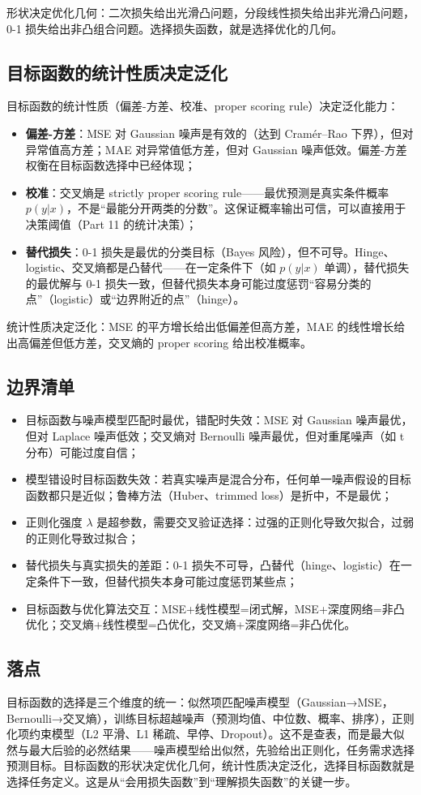 形状决定优化几何：二次损失给出光滑凸问题，分段线性损失给出非光滑凸问题，0-1 损失给出非凸组合问题。选择损失函数，就是选择优化的几何。

\subsection{目标函数的统计性质决定泛化}

目标函数的统计性质（偏差-方差、校准、proper scoring rule）决定泛化能力：

\begin{itemize}
\tightlist
\item
  \textbf{偏差-方差}：MSE 对 Gaussian 噪声是有效的（达到 Cramér--Rao 下界），但对异常值高方差；MAE 对异常值低方差，但对 Gaussian 噪声低效。偏差-方差权衡在目标函数选择中已经体现；
\item
  \textbf{校准}：交叉熵是 strictly proper scoring rule——最优预测是真实条件概率 $p(y|x)$，不是``最能分开两类的分数''。这保证概率输出可信，可以直接用于决策阈值（Part 11 的统计决策）；
\item
  \textbf{替代损失}：0-1 损失是最优的分类目标（Bayes 风险），但不可导。Hinge、logistic、交叉熵都是凸替代——在一定条件下（如 $p(y|x)$ 单调），替代损失的最优解与 0-1 损失一致，但替代损失本身可能过度惩罚``容易分类的点''（logistic）或``边界附近的点''（hinge）。
\end{itemize}

统计性质决定泛化：MSE 的平方增长给出低偏差但高方差，MAE 的线性增长给出高偏差但低方差，交叉熵的 proper scoring 给出校准概率。

\subsection{边界清单}

\begin{itemize}
\tightlist
\item
  目标函数与噪声模型匹配时最优，错配时失效：MSE 对 Gaussian 噪声最优，但对 Laplace 噪声低效；交叉熵对 Bernoulli 噪声最优，但对重尾噪声（如 t 分布）可能过度自信；
\item
  模型错设时目标函数失效：若真实噪声是混合分布，任何单一噪声假设的目标函数都只是近似；鲁棒方法（Huber、trimmed loss）是折中，不是最优；
\item
  正则化强度 $\lambda$ 是超参数，需要交叉验证选择：过强的正则化导致欠拟合，过弱的正则化导致过拟合；
\item
  替代损失与真实损失的差距：0-1 损失不可导，凸替代（hinge、logistic）在一定条件下一致，但替代损失本身可能过度惩罚某些点；
\item
  目标函数与优化算法交互：MSE+线性模型=闭式解，MSE+深度网络=非凸优化；交叉熵+线性模型=凸优化，交叉熵+深度网络=非凸优化。
\end{itemize}

\subsection{落点}

目标函数的选择是三个维度的统一：似然项匹配噪声模型（Gaussian→MSE，Bernoulli→交叉熵），训练目标超越噪声（预测均值、中位数、概率、排序），正则化项约束模型（L2 平滑、L1 稀疏、早停、Dropout）。这不是查表，而是最大似然与最大后验的必然结果——噪声模型给出似然，先验给出正则化，任务需求选择预测目标。目标函数的形状决定优化几何，统计性质决定泛化，选择目标函数就是选择任务定义。这是从``会用损失函数''到``理解损失函数''的关键一步。
